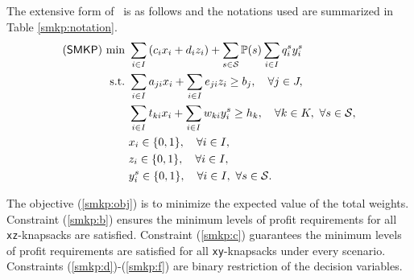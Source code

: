 The extensive form of \smkp\ is as follows and the notations used are summarized in Table \ref{smkp:notation}.
\begin{subequations} \label{smkp:formulation}
	\begin{align}
	(\textsf{SMKP})\ \textrm{min}\ &\sum_{i \in I}\left(c_i x_i + d_i z_i\right) + \sum_{s\in\mathcal{S}}\operatorname*{\mathbb{P}}(s)\sum_{i\in I}q_i^s y_i^s \label{smkp:obj}\\
	\textrm{s.t.}\ &  \sum_{i\in I}a_{ji}x_{i} + \sum_{i \in I}e_{ji}z_i\ge b_j,\quad\forall j\in J, \label{smkp:b}\\
	&  \sum_{i\in I} t_{ki}x_i + \sum_{i\in I}w_{ki} y_i^s\ge h_k,\quad\forall k\in K,\ \forall s\in\mathcal{S}, \label{smkp:c}\\
	&  x_i\in\{0,1\},\quad\forall i\in I, \label{smkp:d}\\
	&  z_i\in\{0,1\},\quad\forall i\in I, \label{smkp:e}\\
	&  y_i^s\in\{0,1\},\quad\forall i\in I,\ \forall s\in \mathcal{S}. \label{smkp:f}
	\end{align}
\end{subequations}

The objective (\ref{smkp:obj}) is to minimize the expected value of the total weights. Constraint (\ref{smkp:b}) ensures the minimum levels of profit requirements for all \texttt{xz}-knapsacks are satisfied. Constraint (\ref{smkp:c}) guarantees the minimum levels of profit requirements are satisfied for all \texttt{xy}-knapsacks under every scenario. Constraints (\ref{smkp:d})-(\ref{smkp:f}) are binary restriction of the decision variables.

